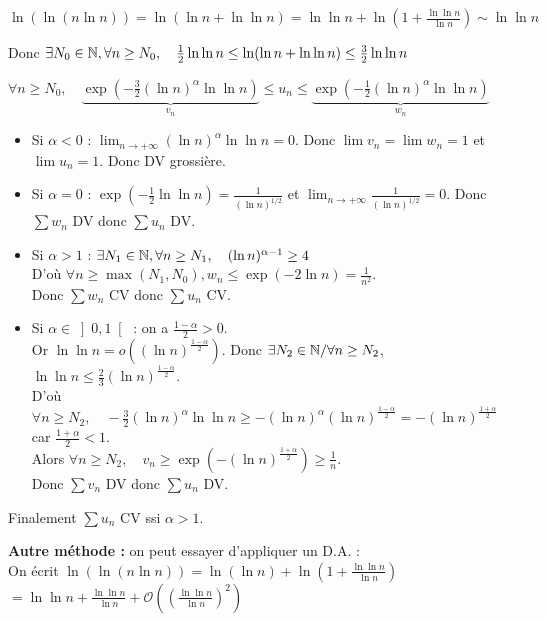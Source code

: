 \begin{solution}
$\ln(\ln(n \ln n)) = \ln(\ln n + \ln \ln n) = \ln \ln n + \ln\left(1 + \frac{\ln \ln n}{\ln n}\right) \sim \ln \ln n$

Donc $\exists N_0 \in \mathbb N, \forall n \geq N_0, \quad \frac{1}{2} \ln \ln n \leq \ln(\ln n + \ln \ln n) \leq \frac{3}{2} \ln \ln n$

$\forall n \geq N_0, \quad \underbrace{\exp\left(-\frac{3}{2}(\ln n)^\alpha \ln \ln n\right)}_{v_n} \leq u_n \leq \underbrace{\exp\left(-\frac{1}{2}(\ln n)^\alpha \ln \ln n\right)}_{w_n}$

\begin{itemize}
  \item Si $\alpha < 0$ : $\lim_{n \to +\infty} (\ln n)^\alpha \ln \ln n = 0$.
  Donc $\lim v_n = \lim w_n = 1$ et $\lim u_n = 1$. Donc DV grossière.
  
  \item Si $\alpha = 0$ : $\exp\left(-\frac{1}{2}\ln \ln n\right) = \frac{1}{(\ln n)^{1/2}}$ et $\lim_{n \to +\infty} \frac{1}{(\ln n)^{1/2}} = 0$.
  Donc $\sum w_n$ DV donc $\sum u_n$ DV.
  
  \item Si $\alpha > 1$ : $\exists N_1 \in \mathbb N, \forall n \geq N_1, \quad (\ln n)^{\alpha-1} \geq 4$\\
  D'où $\forall n \geq \max(N_1, N_0), w_n \leq \exp\left(-2 \ln n\right) = \frac{1}{n^2}$.\\
  Donc $\sum w_n$ CV donc $\sum u_n$ CV.
  
  \item Si $\alpha \in \left]0, 1\right[$ : on a $\frac{1-\alpha}{2} > 0$.\\
  Or $\ln \ln n = o\left( (\ln n)^{\frac{1-\alpha}{2}} \right)$. Donc $\exists N_2 \in \mathbb N / \forall n \geq N_2$, 
  $\ln \ln n \leq \frac{2}{3} (\ln n)^{\frac{1-\alpha}{2}}$.\\
  D'où $\forall n \geq N_2, \quad -\frac{3}{2}(\ln n)^\alpha \ln \ln n \geq -(\ln n)^\alpha (\ln n)^{\frac{1-\alpha}{2}} = -(\ln n)^{\frac{1+\alpha}{2}}$ car $\frac{1+\alpha}{2} < 1$.\\
  Alors $\forall n \geq N_2, \quad v_n \geq \exp\left(-(\ln n)^{\frac{1+\alpha}{2}}\right) \geq \frac{1}{n}$.\\
  Donc $\sum v_n$ DV donc $\sum u_n$ DV.
\end{itemize}
Finalement $\sum u_n$ CV ssi $\alpha > 1$.

\textbf{Autre méthode :} on peut essayer d'appliquer un D.A. :\\
On écrit $\ln(\ln(n \ln n)) = \ln(\ln n) + \ln\left( 1 + \frac{\ln \ln n}{\ln n} \right)$
$= \ln \ln n + \frac{\ln \ln n}{\ln n} + \mathcal{O}\left(\left(\frac{\ln \ln n}{\ln n}\right)^2\right)$


\end{solution}
